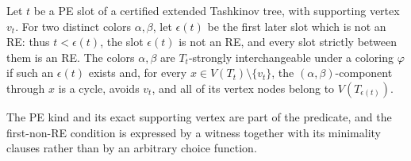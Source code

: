 \begin{definition}
Let \(t\) be a PE slot of a certified extended Tashkinov tree, with
supporting vertex \(v_t\).  For two distinct colors \(\alpha,\beta\),
let \(\epsilon(t)\) be the first later slot which is not an RE: thus
\(t<\epsilon(t)\), the slot \(\epsilon(t)\) is not an RE, and every slot
strictly between them is an RE.  The colors \(\alpha,\beta\) are
\(T_t\)-strongly interchangeable under a coloring \(\varphi\) if such an
\(\epsilon(t)\) exists and, for every
\(x\in V(T_t)\setminus\{v_t\}\), the
\((\alpha,\beta)\)-component through \(x\) is a cycle, avoids \(v_t\),
and all of its vertex nodes belong to \(V(T_{\epsilon(t)})\).

The PE kind and its exact supporting vertex are part of the predicate, and
the first-non-RE condition is expressed by a witness together with its
minimality clauses rather than by an arbitrary choice function.
\end{definition}
